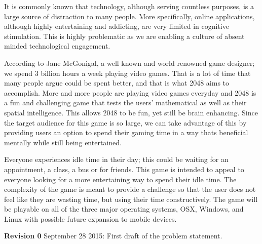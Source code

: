 \documentclass[12pt]{article}
\begin{document}
\begin{titlepage}
		
		
		
		\vfill %
		
\end{titlepage}

It is commonly known that technology, although serving countless purposes, is a large source of distraction to many people. More specifically, online applications, although highly entertaining and addicting, are very limited in cognitive stimulation. This is highly problematic as we are enabling a culture of absent minded technological engagement. \par \vspace{5mm}

According to Jane McGonigal, a well known and world renowned game designer; we spend 3 billion hours a week playing video games. That is a lot of time that many people argue could be spent better, and that is what 2048 aims to accomplish. More and more people are playing video games everyday and 2048 is a fun and challenging game that tests the users' mathematical as well as their spatial intelligence. This allows 2048 to be fun, yet still be brain enhancing. Since the target audience for this game is so large, we can take advantage of this by providing users an option to spend their gaming time in a way thats beneficial mentally while still being entertained. \par \vspace{5mm}

Everyone experiences idle time in their day; this could be waiting for an appointment, a class, a bus or for friends. This game is intended to appeal to everyone looking for a more entertaining way to spend their idle time. The complexity of the game is meant to provide a challenge so that the user does not feel like they are wasting time, but using their time constructively. 
The game will be playable on all of the three major operating systems, OSX, Windows, and Linux with possible future expansion to mobile devices. \vspace{10mm}

\textbf{Revision 0} September 28 2015: First draft of the problem statement. 
\end{document}
